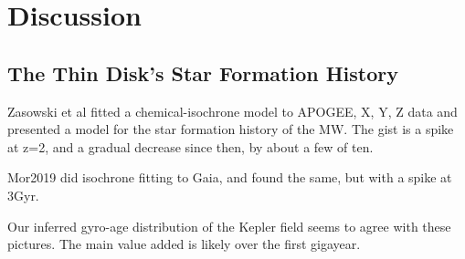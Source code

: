 \documentclass[11pt,twocolumn,tighten]{aastex63}
\begin{document}



\section{Discussion}
\label{sec:disc}

\subsection{The Thin Disk's Star Formation History}

Zasowski et al fitted a chemical-isochrone model to APOGEE, X, Y, Z
data and presented a model for the star formation history of the MW.
The gist is a spike at z=2, and a gradual decrease since then, by
about a few of ten.

Mor2019 did isochrone fitting to Gaia, and found the same, but with a
spike at 3Gyr.

Our inferred gyro-age distribution of the Kepler field seems to agree
with these pictures.  The main value added is likely over the first
gigayear.

%
\end{document}
